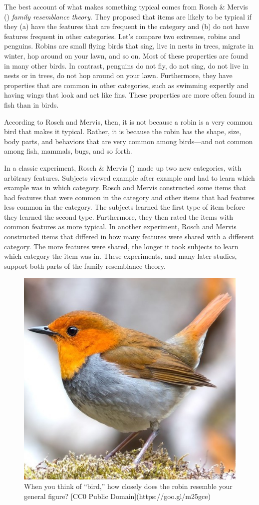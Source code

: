 \documentclass[
]{krantz}
\begin{document}
The best account of what makes something typical comes from Rosch \& Mervis () \emph{family resemblance theory}. They proposed that items are likely to be typical if they (a) have the features that are frequent in the category and (b) do not have features frequent in other categories. Let's compare two extremes, robins and penguins. Robins are small flying birds that sing, live in nests in trees, migrate in winter, hop around on your lawn, and so on. Most of these properties are found in many other birds. In contrast, penguins do not fly, do not sing, do not live in nests or in trees, do not hop around on your lawn. Furthermore, they have properties that are common in other categories, such as swimming expertly and having wings that look and act like fins. These properties are more often found in fish than in birds.

According to Rosch and Mervis, then, it is not because a robin is a very common bird that makes it typical. Rather, it is because the robin has the shape, size, body parts, and behaviors that are very common among birds---and not common among fish, mammals, bugs, and so forth.

In a classic experiment, Rosch \& Mervis () made up two new categories, with arbitrary features. Subjects viewed example after example and had to learn which example was in which category. Rosch and Mervis constructed some items that had features that were common in the category and other items that had features less common in the category. The subjects learned the first type of item before they learned the second type. Furthermore, they then rated the items with common features as more typical. In another experiment, Rosch and Mervis constructed items that differed in how many features were shared with a different category. The more features were shared, the longer it took subjects to learn which category the item was in. These experiments, and many later studies, support both parts of the family resemblance theory.

\begin{figure}

{\centering \includegraphics[width=0.4\linewidth]{images/ch7/bird} 

}

\caption{When you think of “bird,” how closely does the robin resemble your general figure? [CC0 Public Domain](https://goo.gl/m25gce)}\label{fig:bird}
\end{figure}
\end{document}
